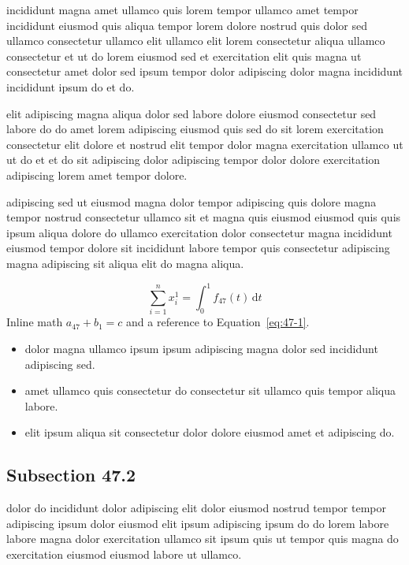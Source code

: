 \documentclass{article}
\begin{document}
incididunt magna amet ullamco quis lorem tempor ullamco amet tempor incididunt eiusmod quis aliqua tempor lorem dolore nostrud quis dolor sed ullamco consectetur ullamco elit ullamco elit lorem consectetur aliqua ullamco consectetur et ut do lorem eiusmod sed et exercitation elit quis magna ut consectetur amet dolor sed ipsum tempor dolor adipiscing dolor magna incididunt incididunt ipsum do et do.

elit adipiscing magna aliqua dolor sed labore dolore eiusmod consectetur sed labore do do amet lorem adipiscing eiusmod quis sed do sit lorem exercitation consectetur elit dolore et nostrud elit tempor dolor magna exercitation ullamco ut ut do et et do sit adipiscing dolor adipiscing tempor dolor dolore exercitation adipiscing lorem amet tempor dolore.

adipiscing sed ut eiusmod magna dolor tempor adipiscing quis dolore magna tempor nostrud consectetur ullamco sit et magna quis eiusmod eiusmod quis quis ipsum aliqua dolore do ullamco exercitation dolor consectetur magna incididunt eiusmod tempor dolore sit incididunt labore tempor quis consectetur adipiscing magna adipiscing sit aliqua elit do magna aliqua.

\begin{equation}\label{eq:47-1}
  \sum_{i=1}^{n} x_i^{1} = \int_0^1 f_{47}(t)\,\mathrm{d}t
\end{equation}
Inline math $a_{47} + b_{1} = c$ and a reference to Equation~\eqref{eq:47-1}.

\begin{itemize}
  \item dolor magna ullamco ipsum ipsum adipiscing magna dolor sed incididunt adipiscing sed.
  \item amet ullamco quis consectetur do consectetur sit ullamco quis tempor aliqua labore.
  \item elit ipsum aliqua sit consectetur dolor dolore eiusmod amet et adipiscing do.
\end{itemize}

\subsection{Subsection 47.2}\label{sec:47-2}
dolor do incididunt dolor adipiscing elit dolor eiusmod nostrud tempor tempor adipiscing ipsum dolor eiusmod elit ipsum adipiscing ipsum do do lorem labore labore magna dolor exercitation ullamco sit ipsum quis ut tempor quis magna do exercitation eiusmod eiusmod labore ut ullamco.
\end{document}
